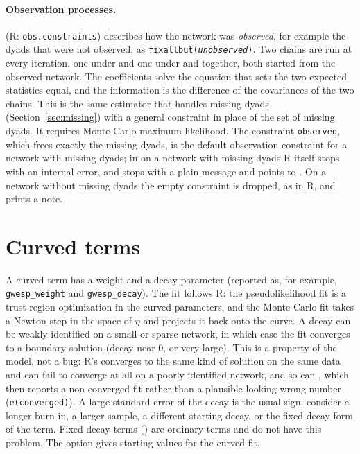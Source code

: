 \paragraph{Observation processes.}  (R: \texttt{obs.constraints}) describes how the network was \emph{observed}, for example the dyads that were not observed, as \texttt{fixallbut(\emph{unobserved})}. Two chains are run at every iteration, one under  and one under  and  together, both started from the observed network. The coefficients solve the equation that sets the two expected statistics equal, and the information is the difference of the covariances of the two chains. This is the same estimator that handles missing dyads (Section~\ref{sec:missing}) with a general constraint in place of the set of missing dyads. It requires Monte Carlo maximum likelihood. The constraint \texttt{observed}, which frees exactly the missing dyads, is the default observation constraint for a network with missing dyads; in  on a network with missing dyads R itself stops with an internal error, and \nwergm{} stops with a plain message and points to . On a network without missing dyads the empty constraint is dropped, as in R, and \nwergm{} prints a note.

\section{Curved terms}\label{sec:curved}

A curved term has a weight and a decay parameter (reported as, for example, \texttt{gwesp\_weight} and \texttt{gwesp\_decay}). The fit follows R: the pseudolikelihood fit is a trust-region optimization in the curved parameters, and the Monte Carlo fit takes a Newton step in the space of $\eta$ and projects it back onto the curve. A decay can be weakly identified on a small or sparse network, in which case the fit converges to a boundary solution (decay near 0, or very large). This is a property of the model, not a bug: R's \ergm{} converges to the same kind of solution on the same data and can fail to converge at all on a poorly identified network, and so can \nwergm{}, which then reports a non-converged fit rather than a plausible-looking wrong number (\texttt{e(converged)}). A large standard error of the decay is the usual sign; consider a longer burn-in, a larger sample, a different starting decay, or the fixed-decay form of the term. Fixed-decay terms () are ordinary terms and do not have this problem. The option  gives starting values for the curved fit.


